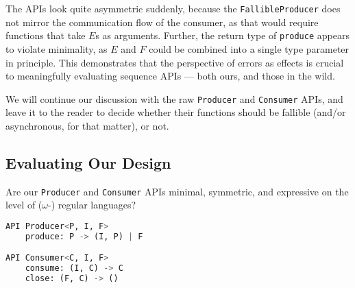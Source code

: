 \documentclass[sigplan,screen,10pt,review]{acmart}
\begin{document}
The APIs look quite asymmetric suddenly, because the \texttt{FallibleProducer} does not mirror the communication flow of the consumer, as that would require functions that take $E$s as arguments. Further, the return type of \texttt{produce} appears to violate minimality, as $E$ and $F$ could be combined into a single type parameter in principle. This demonstrates that the perspective of errors as effects is crucial to meaningfully evaluating sequence APIs --- both ours, and those in the wild.



We will continue our discussion with the raw \texttt{Producer} and \texttt{Consumer} APIs, and leave it to the reader to decide whether their functions should be fallible (and/or asynchronous, for that matter), or not.

\subsection{Evaluating Our Design}\label{evaluating_ours}

Are our \texttt{Producer} and \texttt{Consumer} APIs minimal, symmetric, and expressive on the level of ($\omega$-) regular languages?

\begin{lstlisting}[language=Python]
API Producer<P, I, F>
    produce: P -> (I, P) | F

API Consumer<C, I, F>
    consume: (I, C) -> C
    close: (F, C) -> ()
\end{lstlisting}
\end{document}

